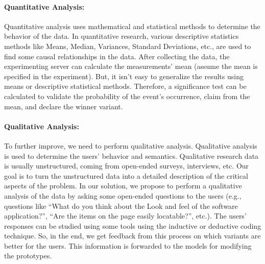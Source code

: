 
\paragraph{Quantitative Analysis:}
\label{solutionideas:paragraph:quantitative}
Quantitative analysis uses mathematical and statistical methods to determine the behavior of the data.
In quantitative research, various descriptive statistics methods like Means, Median, Variances, Standard Deviations, etc., are used to find some causal relationships in the data.
After collecting the data, the experimenting server can calculate the measurements' mean (assume the mean is specified in the experiment).
But, it isn't easy to generalize the results using means or descriptive statistical methods. 
Therefore, a significance test can be calculated to validate the probability of the event's occurrence, claim from the mean, and declare the winner variant.

\paragraph{Qualitative Analysis:}
\label{solutionideas:paragraph:qualitative}
To further improve, we need to perform qualitative analysis.
Qualitative analysis is used to determine the users' behavior and semantics.
Qualitative research data is usually unstructured, coming from open-ended surveys, interviews, etc. 
Our goal is to turn the unstructured data into a detailed description of the critical aspects of the problem.
In our solution, we propose to perform a qualitative analysis of the data by asking some open-ended questions to the users
(e.g., questions like ``What do you think about the Look and feel of the software application?'', ``Are the items on the page easily locatable?'', etc.).
The users' responses can be studied using some tools using the inductive or deductive coding technique. 
So, in the end, we get feedback from this process on which variants are better for the users. 
This information is forwarded to the models for modifying the prototypes.

